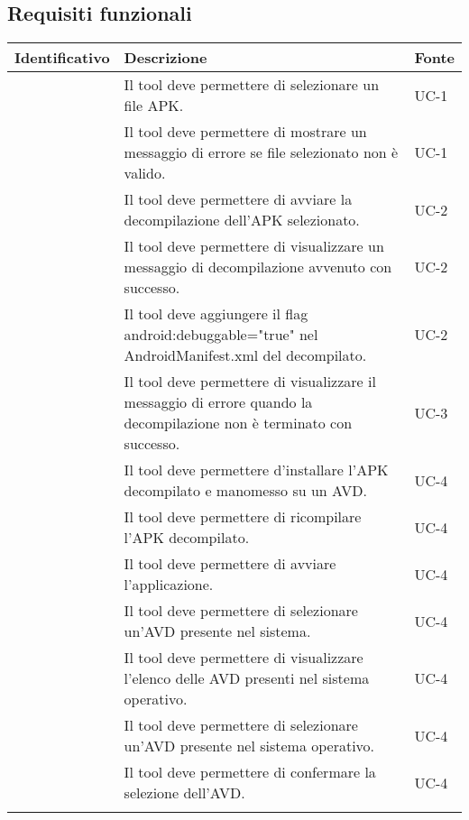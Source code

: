 \subsection{Requisiti funzionali}\label{subsec:requisiti-funzionali}
\renewcommand{\arraystretch}{1.5}
\begin{center}
    \begin{longtable}{ | c| C{7cm} |C{3cm} |}
        \hline
        \textbf{Identificativo} & \textbf{Descrizione} &\textbf{Fonte}\\\hline
         & Il tool deve permettere di selezionare un file APK.& UC-1\\\hline
         & Il tool deve permettere di mostrare un messaggio di errore se file selezionato non è valido.& UC-1\\\hline
        \setcounter{subCount}{0}

         & Il tool deve permettere di avviare la decompilazione dell'APK selezionato.& UC-2\\\hline
         & Il tool deve permettere di visualizzare un messaggio di decompilazione avvenuto con successo.& UC-2\\\hline
         & Il tool deve aggiungere il flag android:debuggable="true" nel AndroidManifest.xml del decompilato.& UC-2\\\hline
        \setcounter{subCount}{0}

         & Il tool deve permettere di visualizzare il messaggio di errore quando la decompilazione non è terminato con successo.& UC-3\\\hline
         & Il tool deve permettere d'installare l'APK decompilato e manomesso su un AVD. & UC-4 \\\hline
         & Il tool deve permettere di ricompilare l'APK decompilato.& UC-4\\\hline
         & Il tool deve permettere di avviare l'applicazione.& UC-4\\\hline

         & Il tool deve permettere di selezionare un'AVD presente nel sistema.& UC-4 \\\hline
         & Il tool deve permettere di visualizzare l'elenco delle AVD presenti nel sistema operativo.& UC-4\\\hline
         & Il tool deve permettere di selezionare un'AVD presente nel sistema operativo.& UC-4\\\hline
         & Il tool deve permettere di confermare la selezione dell'AVD.& UC-4\\\hline
        \setcounter{subCount}{0}


\end{longtable}
\end{center}
